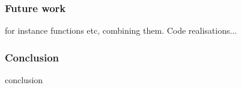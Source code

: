 

\begin{frame}[fragile]
\frametitle{Future work}

for instance functions etc, combining them. Code realisations...

\end{frame}


\begin{frame}[fragile]
\frametitle{Conclusion}

conclusion

\end{frame}




